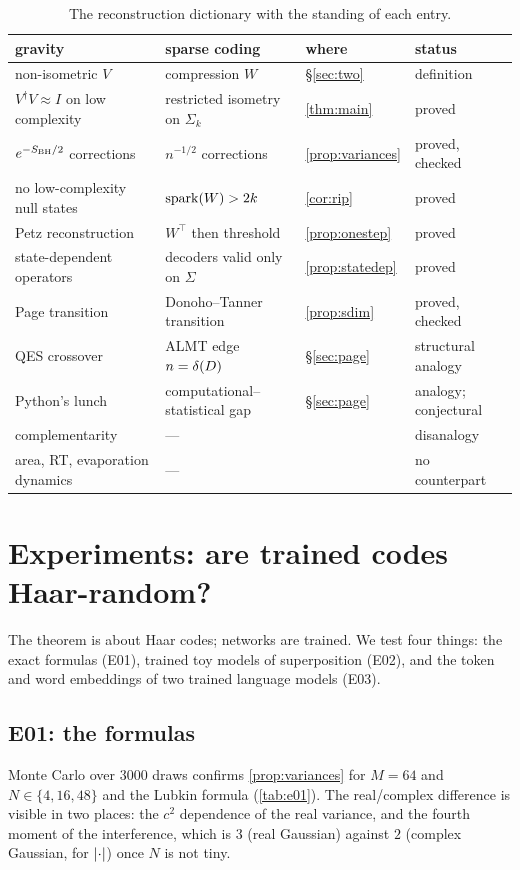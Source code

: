 \begin{table}[h]
\centering\small
\begin{tabular}{@{}p{3.7cm}p{4.1cm}p{3.0cm}l@{}}
\toprule
gravity & sparse coding & where & status \\
\midrule
non-isometric $V$ & compression $W$ & \S\ref{sec:two} & definition \\
$V^\dagger V\approx I$ on low complexity & restricted isometry on $\Sigma_k$ & \cref{thm:main} & proved \\
$e^{-S_{\rm BH}/2}$ corrections & $n^{-1/2}$ corrections & \cref{prop:variances} & proved, checked \\
no low-complexity null states & $\operatorname{spark}(W)>2k$ & \cref{cor:rip} & proved \\
Petz reconstruction & $W^\top$ then threshold & \cref{prop:onestep} & proved \\
state-dependent operators & decoders valid only on $\Sigma$ & \cref{prop:statedep} & proved \\
Page transition & Donoho--Tanner transition & \cref{prop:sdim} & proved, checked \\
QES crossover & ALMT edge $n=\delta(D)$ & \S\ref{sec:page} & structural analogy \\
Python's lunch & computational--statistical gap & \S\ref{sec:page} & analogy; conjectural \\
complementarity & --- & & disanalogy \\
area, RT, evaporation dynamics & --- & & no counterpart \\
\bottomrule
\end{tabular}
\caption{The reconstruction dictionary with the standing of each entry.}
\label{tab:dictionary}
\end{table}

\section{Experiments: are trained codes Haar-random?}\label{sec:part1-exp}

The theorem is about Haar codes; networks are trained. We test four things: the exact formulas (E01), trained toy
models of superposition (E02), and the token and word embeddings of two trained language models (E03).

\subsection{E01: the formulas}
Monte Carlo over 3000 draws confirms \cref{prop:variances} for $M=64$ and $N\in\{4,16,48\}$ and the Lubkin formula
(\cref{tab:e01}). The real/complex difference is visible in two places: the $c^2$ dependence of the real variance,
and the fourth moment of the interference, which is $3$ (real Gaussian) against $2$ (complex Gaussian, for
$\lvert \cdot\rvert$) once $N$ is not tiny.


